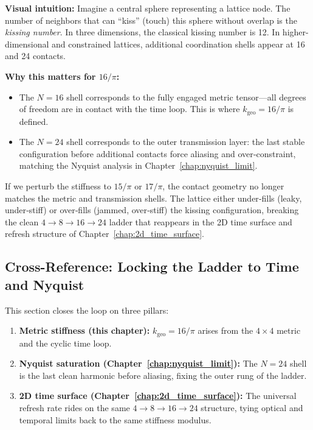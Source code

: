 \documentclass[11pt, letterpaper, openany]{book}
\begin{document}
\begin{tcolorbox}[colback=black!3,colframe=kishblue,title={Kissing Numbers and Lattice Stiffness}]
\textbf{Visual intuition:} Imagine a central sphere representing a lattice node. The number of
neighbors that can ``kiss'' (touch) this sphere without overlap is the \emph{kissing number}.
In three dimensions, the classical kissing number is 12. In higher-dimensional and constrained
lattices, additional coordination shells appear at 16 and 24 contacts.

\medskip

\textbf{Why this matters for $16/\pi$:}
\begin{itemize}
    \item The $N=16$ shell corresponds to the fully engaged metric tensor---all degrees of
          freedom are in contact with the time loop. This is where $k_{\text{geo}} = 16/\pi$
          is defined.
    \item The $N=24$ shell corresponds to the outer transmission layer: the last stable
          configuration before additional contacts force aliasing and over‑constraint,
          matching the Nyquist analysis in Chapter~\ref{chap:nyquist_limit}.
\end{itemize}

If we perturb the stiffness to $15/\pi$ or $17/\pi$, the contact geometry no longer matches
the metric and transmission shells. The lattice either under‑fills (leaky, under‑stiff) or
over‑fills (jammed, over‑stiff) the kissing configuration, breaking the clean $4 \rightarrow 8
\rightarrow 16 \rightarrow 24$ ladder that reappears in the 2D time surface and refresh
structure of Chapter~\ref{chap:2d_time_surface}.
\end{tcolorbox}

\subsection{Cross-Reference: Locking the Ladder to Time and Nyquist}
\label{subsec:crossref_12_19}

This section closes the loop on three pillars:

\begin{enumerate}
    \item \textbf{Metric stiffness (this chapter):} $k_{\text{geo}} = 16/\pi$ arises from the
          $4 \times 4$ metric and the cyclic time loop.
    \item \textbf{Nyquist saturation (Chapter~\ref{chap:nyquist_limit}):} The $N=24$ shell
          is the last clean harmonic before aliasing, fixing the outer rung of the ladder.
    \item \textbf{2D time surface (Chapter~\ref{chap:2d_time_surface}):} The universal
          refresh rate rides on the same $4 \rightarrow 8 \rightarrow 16 \rightarrow 24$
          structure, tying optical and temporal limits back to the same stiffness modulus.
\end{enumerate}
\end{document}
